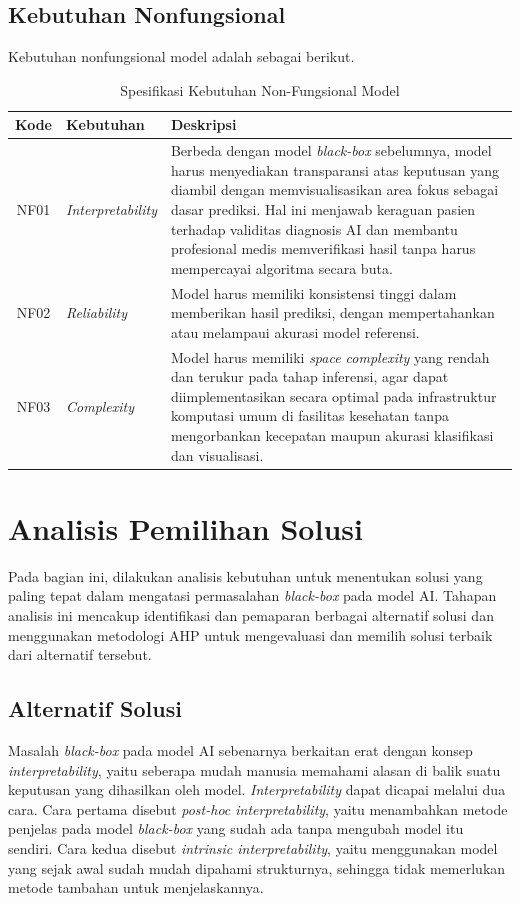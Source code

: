 \subsection{Kebutuhan Nonfungsional}
Kebutuhan nonfungsional model adalah sebagai berikut.
\begin{table}[h]
	\centering
	\caption{Spesifikasi Kebutuhan Non-Fungsional Model}
	\label{tab:kebutuhan_non_fungsional}
	\begin{tabular}{|c|l|p{9.5cm}|}
		\hline
		\textbf{Kode} & \textbf{Kebutuhan} & \textbf{Deskripsi} \\ \hline
		NF01 & \textit{Interpretability} & Berbeda dengan model \textit{black-box} sebelumnya, model harus menyediakan transparansi atas keputusan yang diambil dengan memvisualisasikan area fokus sebagai dasar prediksi. Hal ini menjawab keraguan pasien terhadap validitas diagnosis AI dan membantu profesional medis memverifikasi hasil tanpa harus mempercayai algoritma secara buta. \\ \hline
		NF02 & \textit{Reliability} & Model harus memiliki konsistensi tinggi dalam memberikan hasil prediksi, dengan mempertahankan atau melampaui akurasi model referensi. \\ \hline
		NF03 & \textit{Complexity} & Model harus memiliki \textit{space complexity} yang rendah dan terukur pada tahap inferensi, agar dapat diimplementasikan secara optimal pada infrastruktur komputasi umum di fasilitas kesehatan tanpa mengorbankan kecepatan maupun akurasi klasifikasi dan visualisasi. \\ \hline
	\end{tabular}
\end{table}

\section{Analisis Pemilihan Solusi}
\label{sec:analisispemilihansolusi}
Pada bagian ini, dilakukan analisis kebutuhan untuk menentukan solusi yang paling tepat dalam mengatasi permasalahan \textit{black-box} pada model AI. Tahapan analisis ini mencakup identifikasi dan pemaparan berbagai alternatif solusi dan menggunakan metodologi AHP untuk mengevaluasi dan memilih solusi terbaik dari alternatif tersebut.

\subsection{Alternatif Solusi}

Masalah \textit{black-box} pada model AI sebenarnya berkaitan erat dengan konsep \textit{interpretability}, yaitu seberapa mudah manusia memahami alasan di balik suatu keputusan yang dihasilkan oleh model. \textit{Interpretability} dapat dicapai melalui dua cara. Cara pertama disebut \textit{post-hoc interpretability}, yaitu menambahkan metode penjelas pada model \textit{black-box} yang sudah ada tanpa mengubah model itu sendiri. Cara kedua disebut \textit{intrinsic interpretability}, yaitu menggunakan model yang sejak awal sudah mudah dipahami strukturnya, sehingga tidak memerlukan metode tambahan untuk menjelaskannya.

